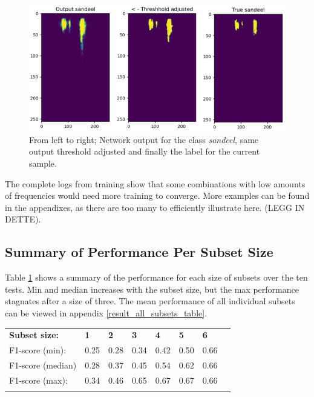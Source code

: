         \begin{figure}[H]
            \centering
            \includegraphics[scale=0.7]{figures/SANDEEL_WITH_LABEL.png}
            \caption[Examle output, threshold and label]{From left to right; Network output for the class \textit{sandeel}, same output threshold adjusted and finally the label for the current sample.}
          	\medskip 
            \label{sandeel_threshold_label}
        \end{figure}
    
    
     The complete logs from training show that some combinations with low amounts of frequencies would need more training to converge. More examples can be found in the appendixes, as there are too many to efficiently illustrate here.  (LEGG IN DETTE). 
    

\subsection{Summary of Performance Per Subset Size}
    Table \ref{summary_per_subset_size_table} shows a summary of the performance for each size of subsets over the ten tests. Min and median increases with the subset size, but the max performance stagnates after a size of three. The mean performance of all individual subsets can be viewed in appendix \ref{result_all_subsets_table}.
\begin{longtable}{llllllll}
                  &      &      &      &      &      &      &  \\ \hline
\endfirsthead
%
\endhead
%
\hline
\endfoot
%
\endlastfoot
%
\textbf{Subset size:}      & \textbf{1}    & \textbf{2}    & \textbf{3}    & \textbf{4}    & \textbf{5}    & \textbf{6}    &  \\ \hline
F1-score (min):   & 0.25 & 0.28 & 0.34 & 0.42 & 0.50 & 0.66 &  \\
F1-score (median) & 0.28 & 0.37 & 0.45 & 0.54 & 0.62 & 0.66 &  \\
F1-score (max):   & 0.34 & 0.46 & 0.65 & 0.67 & 0.67 & 0.66 &  \\ \hline
\label{summary_per_subset_size_table}
\end{longtable}
    
